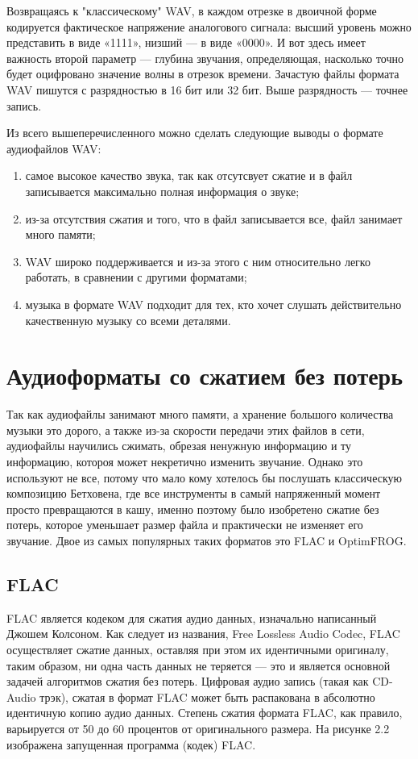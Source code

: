 \documentclass[12pt,a4paper,oneside]{report}
\begin{document}
Возвращаясь к "классическому" WAV, в каждом отрезке в двоичной форме кодируется фактическое напряжение аналогового сигнала: высший уровень можно представить в виде «1111», низший — в виде «0000». И вот здесь имеет важность второй параметр — глубина звучания, определяющая, насколько точно будет оцифровано значение волны в отрезок времени. Зачастую файлы формата WAV пишутся с разрядностью в 16 бит или 32 бит. Выше разрядность — точнее запись.

Из всего вышеперечисленного можно сделать следующие выводы о формате аудиофайлов WAV:
\begin{enumerate}
	\item самое высокое качество звука, так как отсутсвует сжатие и в файл записывается максимально полная информация о звуке;
	\item из-за отсутствия сжатия и того, что в файл записывается все, файл занимает много памяти;
	\item WAV широко поддерживается и из-за этого с ним относительно легко работать, в сравнении с другими форматами;
	\item музыка в формате WAV подходит для тех, кто хочет слушать действительно качественную музыку со всеми деталями.
\end{enumerate}

\section{Аудиоформаты со сжатием без потерь} 
\quad
Так как аудиофайлы занимают много памяти, а хранение большого количества музыки это дорого, а также из-за скорости передачи этих файлов в сети, аудиофайлы научились сжимать, обрезая ненужную информацию и ту информацию, котороя может некретично изменить звучание. Однако это используют не все, потому что мало кому хотелось бы послушать классическую композицию Бетховена, где все инструменты в самый напряженный момент просто превращаются в кашу, именно поэтому было изобретено сжатие без потерь, которое уменьшает размер файла и практически не изменяет его звучание.
Двое из самых популярных таких форматов это FLAC и OptimFROG.
\subsection{FLAC}
FLAC является кодеком для сжатия аудио данных, изначально написанный Джошем Колсоном. Как следует из названия, Free Lossless Audio Codec, FLAC осуществляет сжатие данных, оставляя при этом их идентичными оригиналу, таким образом, ни одна часть данных не теряется — это и является основной задачей алгоритмов сжатия без потерь. Цифровая аудио запись (такая как CD-Audio трэк), сжатая в формат FLAC может быть распакована в абсолютно идентичную копию аудио данных. Степень сжатия формата FLAC, как правило, варьируется от 50 до 60 процентов от оригинального размера\cite{two}. На рисунке 2.2 изображена запущенная программа (кодек) FLAC.
\end{document}
